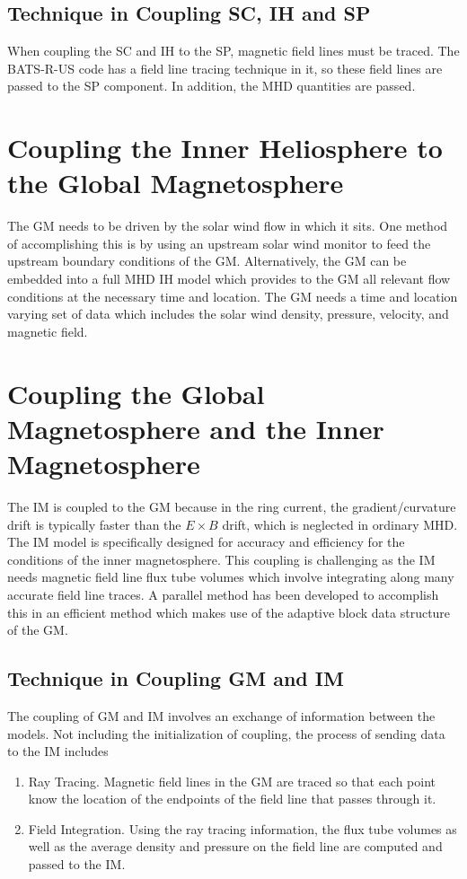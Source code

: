 \documentclass[twoside,10pt]{article}
\begin{document}
\subsection{Technique in Coupling SC, IH and SP}

When coupling the SC and IH to the SP, magnetic field lines must be
traced.  The BATS-R-US code has a field line tracing technique in it,
so these field lines are passed to the SP component.  In addition, the
MHD quantities are passed.

\section{Coupling the Inner Heliosphere to the Global Magnetosphere}

The GM needs to be driven by the solar wind flow in which it sits.
One method of accomplishing this is by using an upstream solar wind
monitor to feed the upstream boundary conditions of the GM.
Alternatively, the GM can be embedded into a full MHD IH model which
provides to the GM all relevant flow conditions at the necessary time
and location.  The GM needs a time and location varying set of data
which includes the solar wind density, pressure, velocity, and
magnetic field.

\section{Coupling the Global Magnetosphere and the Inner Magnetosphere}

The IM is coupled to the GM because in the ring current, the
gradient/curvature drift is typically faster than the $E \times B$
drift, which is neglected in ordinary MHD.  The IM model is
specifically designed for accuracy and efficiency for the conditions of
the inner magnetosphere.  This coupling is challenging as the IM needs
magnetic field line flux tube volumes which involve integrating along
many accurate field line traces.  A parallel method has been developed
to accomplish this in an efficient method which makes use of the
adaptive block data structure of the GM.

\subsection{Technique in Coupling GM and IM}

The coupling of GM and IM involves an exchange of information between
the models.  Not including the initialization of coupling, the process
of sending data to the IM includes
\begin{enumerate}
\item Ray Tracing.  Magnetic field lines in the GM are traced so that
  each point know the location of the endpoints of the field line that
  passes through it.
\item Field Integration.  Using the ray tracing information, the flux
  tube volumes as well as the average density and pressure on the field
  line are computed and passed to the IM.
\end{enumerate}
\end{document}
